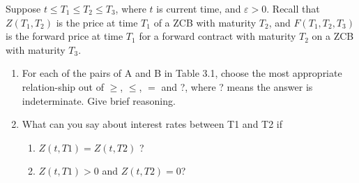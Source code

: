 \documentclass{article}
\begin{document}
    \begin{example}
      
    \end{example}

    \begin{exercise}[Blyth 3.1]
      Suppose $t \leq T_1 \leq T_2 \leq T_3$, where $t$ is current time, and $\varepsilon > 0$. Recall that $Z(T_1, T_2)$ is the price at time $T_1$ of a ZCB with maturity $T_2$, and $F(T_1, T_2, T_3)$ is the forward price at time $T_1$ for a forward contract with maturity $T_2$ on a ZCB with maturity $T_3$.
      \begin{enumerate}
        \item For each of the pairs of A and B in Table 3.1, choose the most appropriate relation-ship out of $\geq$, $\leq$, $=$ and ?, where ? means the answer is indeterminate. Give brief reasoning.
        \item What can you say about interest rates between T1 and T2 if 
          \begin{enumerate}
            \item $Z(t,T1) = Z(t,T2)$ ?
            \item $Z(t,T1) > 0$ and $Z(t,T2) = 0$?
          \end{enumerate}
      \end{enumerate}
    \end{exercise}
\end{document}
